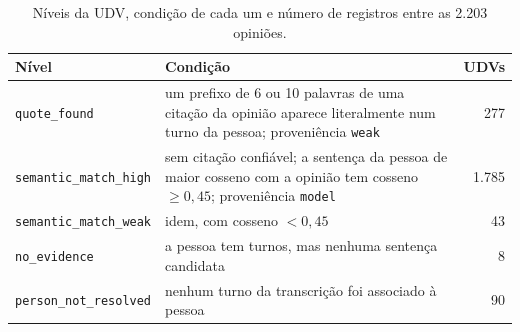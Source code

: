 \begin{table}[!htb]
  \centering
  \caption{Níveis da UDV, condição de cada um e número de registros entre as 2.203 opiniões.}
  \label{tab:udv-niveis}
  \small
  \begin{tabularx}{\textwidth}{@{}lXr@{}}
    \toprule
    \textbf{Nível} & \textbf{Condição} & \textbf{UDVs} \\
    \midrule
    \texttt{quote\_found}         & um prefixo de 6 ou 10 palavras de uma citação da opinião aparece literalmente num turno da pessoa; proveniência \texttt{weak} & 277 \\
    \texttt{semantic\_match\_high} & sem citação confiável; a sentença da pessoa de maior cosseno com a opinião tem cosseno $\geq 0{,}45$; proveniência \texttt{model} & 1.785 \\
    \texttt{semantic\_match\_weak} & idem, com cosseno $< 0{,}45$ & 43 \\
    \texttt{no\_evidence}         & a pessoa tem turnos, mas nenhuma sentença candidata & 8 \\
    \texttt{person\_not\_resolved} & nenhum turno da transcrição foi associado à pessoa & 90 \\
    \bottomrule
  \end{tabularx}
\end{table}
